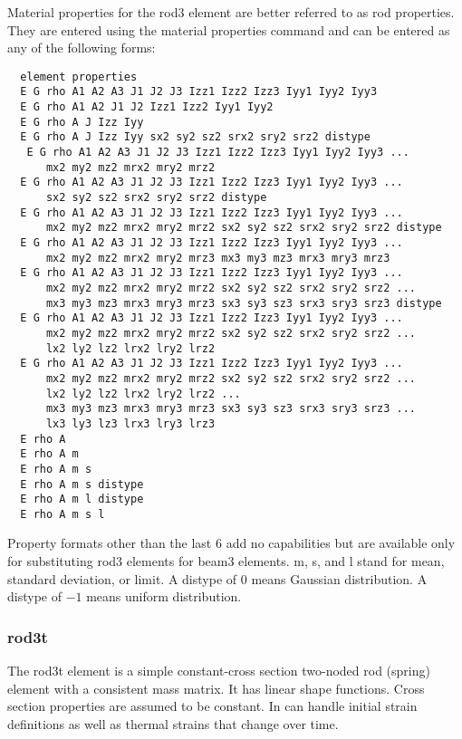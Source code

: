 \documentclass[12pt]{article}
\newcommand*{\command}[1]{\textsf{#1}}
\begin{document}
Material properties for the \command{rod3} element  are better referred to as rod
properties. They are entered using the material properties command and
can be entered as any of the following forms:
\begin{lstlisting}
  element properties
  E G rho A1 A2 A3 J1 J2 J3 Izz1 Izz2 Izz3 Iyy1 Iyy2 Iyy3
  E G rho A1 A2 J1 J2 Izz1 Izz2 Iyy1 Iyy2
  E G rho A J Izz Iyy
  E G rho A J Izz Iyy sx2 sy2 sz2 srx2 sry2 srz2 distype
   E G rho A1 A2 A3 J1 J2 J3 Izz1 Izz2 Izz3 Iyy1 Iyy2 Iyy3 ...
      mx2 my2 mz2 mrx2 mry2 mrz2
  E G rho A1 A2 A3 J1 J2 J3 Izz1 Izz2 Izz3 Iyy1 Iyy2 Iyy3 ...
      sx2 sy2 sz2 srx2 sry2 srz2 distype
  E G rho A1 A2 A3 J1 J2 J3 Izz1 Izz2 Izz3 Iyy1 Iyy2 Iyy3 ...
      mx2 my2 mz2 mrx2 mry2 mrz2 sx2 sy2 sz2 srx2 sry2 srz2 distype
  E G rho A1 A2 A3 J1 J2 J3 Izz1 Izz2 Izz3 Iyy1 Iyy2 Iyy3 ...
      mx2 my2 mz2 mrx2 mry2 mrz3 mx3 my3 mz3 mrx3 mry3 mrz3
  E G rho A1 A2 A3 J1 J2 J3 Izz1 Izz2 Izz3 Iyy1 Iyy2 Iyy3 ...
      mx2 my2 mz2 mrx2 mry2 mrz2 sx2 sy2 sz2 srx2 sry2 srz2 ...
      mx3 my3 mz3 mrx3 mry3 mrz3 sx3 sy3 sz3 srx3 sry3 srz3 distype
  E G rho A1 A2 A3 J1 J2 J3 Izz1 Izz2 Izz3 Iyy1 Iyy2 Iyy3 ...
      mx2 my2 mz2 mrx2 mry2 mrz2 sx2 sy2 sz2 srx2 sry2 srz2 ...
      lx2 ly2 lz2 lrx2 lry2 lrz2
  E G rho A1 A2 A3 J1 J2 J3 Izz1 Izz2 Izz3 Iyy1 Iyy2 Iyy3 ...
      mx2 my2 mz2 mrx2 mry2 mrz2 sx2 sy2 sz2 srx2 sry2 srz2 ...
      lx2 ly2 lz2 lrx2 lry2 lrz2 ...
      mx3 my3 mz3 mrx3 mry3 mrz3 sx3 sy3 sz3 srx3 sry3 srz3 ...
      lx3 ly3 lz3 lrx3 lry3 lrz3
  E rho A
  E rho A m
  E rho A m s
  E rho A m s distype
  E rho A m l distype
  E rho A m s l
\end{lstlisting}
Property formats other than the last 6 add no capabilities but are available
only for substituting \command{rod3} elements for \command{beam3} elements. \command{m}, \command{s}, and \command{l}
stand for mean, standard deviation, or limit. A \command{distype} of $0$
means Gaussian distribution. A \command{distype} of $-1$ means uniform distribution.

\subsubsection{\command{rod3t}}\label{el:rod3t}
The \command{rod3t} element is a simple constant-cross section two-noded rod (spring) element with a consistent mass matrix.  It has linear shape functions. Cross section properties are assumed to be constant. In can handle initial strain definitions as well as thermal strains that change over time.
\end{document}
